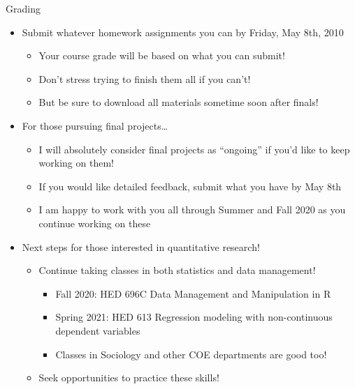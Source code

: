 \documentclass[8pt,ignorenonframetext,dvipsnames]{beamer}
\providecommand{\tightlist}{%
  \setlength{\itemsep}{0pt}\setlength{\parskip}{0pt}}
\let\olditem\item
\renewcommand{\item}{%
  \olditem\vspace{4pt}
}
\begin{document}
\begin{frame}{Grading}
\protect\hypertarget{grading}{}

\begin{itemize}
\tightlist
\item
  Submit whatever homework assignments you can by Friday, May 8th, 2010

  \begin{itemize}
  \tightlist
  \item
    Your course grade will be based on what you can submit!
  \item
    Don't stress trying to finish them all if you can't!
  \item
    But be sure to download all materials sometime soon after finals!
  \end{itemize}
\end{itemize}

\medskip

\begin{itemize}
\tightlist
\item
  For those pursuing final projects\ldots{}

  \begin{itemize}
  \tightlist
  \item
    I will absolutely consider final projects as ``ongoing'' if you'd
    like to keep working on them!
  \item
    If you would like detailed feedback, submit what you have by May 8th
  \item
    I am happy to work with you all through Summer and Fall 2020 as you
    continue working on these
  \end{itemize}
\end{itemize}

\medskip

\begin{itemize}
\tightlist
\item
  Next steps for those interested in quantitative research!

  \begin{itemize}
  \tightlist
  \item
    Continue taking classes in both statistics and data management!

    \begin{itemize}
    \tightlist
    \item
      Fall 2020: HED 696C Data Management and Manipulation in R
    \item
      Spring 2021: HED 613 Regression modeling with non-continuous
      dependent variables
    \item
      Classes in Sociology and other COE departments are good too!
    \end{itemize}
  \item
    Seek opportunities to practice these skills!
  \end{itemize}
\end{itemize}

\end{frame}
\end{document}
